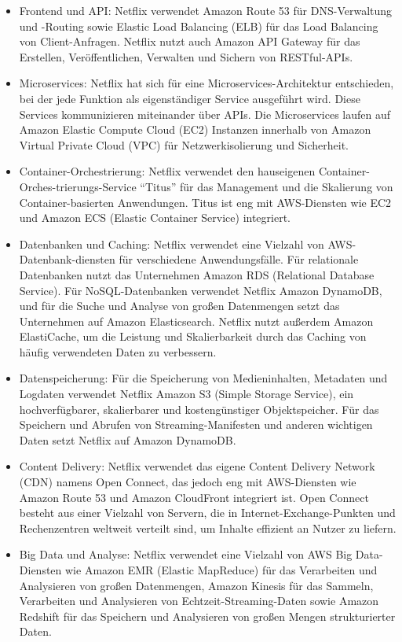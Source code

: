\documentclass[../vs-script-first-v01.tex]{subfiles}
\begin{document}
\begin{itemize}
\item Frontend und API: Netflix verwendet Amazon Route 53 für DNS-Verwaltung und -Routing sowie Elastic Load Balancing (ELB) für das Load Balancing von Client-Anfragen. Netflix nutzt auch Amazon API Gateway für das Erstellen, Veröffentlichen, Verwalten und Sichern von RESTful-APIs.
\item Microservices: Netflix hat sich für eine Microservices-Architektur entschieden, bei der jede Funktion als eigenständiger Service ausgeführt wird. Diese Services kommunizieren miteinander über APIs. Die Microservices laufen auf Amazon Elastic Compute Cloud (EC2) Instanzen innerhalb von Amazon Virtual Private Cloud (VPC) für Netzwerkisolierung und Sicherheit.
\item Container-Orchestrierung: Netflix verwendet den hauseigenen Container-Orches-trierungs-Service \enquote{Titus} für das Management und die Skalierung von Container-basierten Anwendungen. Titus ist eng mit AWS-Diensten wie EC2 und Amazon ECS (Elastic Container Service) integriert.
\item Datenbanken und Caching: Netflix verwendet eine Vielzahl von AWS-Datenbank-diensten für verschiedene Anwendungsfälle. Für relationale Datenbanken nutzt das Unternehmen Amazon RDS (Relational Database Service). Für NoSQL-Datenbanken verwendet Netflix Amazon DynamoDB, und für die Suche und Analyse von großen Datenmengen setzt das Unternehmen auf Amazon Elasticsearch. Netflix nutzt außerdem Amazon ElastiCache, um die Leistung und Skalierbarkeit durch das Caching von häufig verwendeten Daten zu verbessern.
\item Datenspeicherung: Für die Speicherung von Medieninhalten, Metadaten und Logdaten verwendet Netflix Amazon S3 (Simple Storage Service), ein hochverfügbarer, skalierbarer und kostengünstiger Objektspeicher. Für das Speichern und Abrufen von Streaming-Manifesten und anderen wichtigen Daten setzt Netflix auf Amazon DynamoDB.
\item Content Delivery: Netflix verwendet das eigene Content Delivery Network (CDN) namens Open Connect, das jedoch eng mit AWS-Diensten wie Amazon Route 53 und Amazon CloudFront integriert ist. Open Connect besteht aus einer Vielzahl von Servern, die in Internet-Exchange-Punkten und Rechenzentren weltweit verteilt sind, um Inhalte effizient an Nutzer zu liefern.
\item Big Data und Analyse: Netflix verwendet eine Vielzahl von AWS Big Data-Diensten wie Amazon EMR (Elastic MapReduce) für das Verarbeiten und Analysieren von großen Datenmengen, Amazon Kinesis für das Sammeln, Verarbeiten und Analysieren von Echtzeit-Streaming-Daten sowie Amazon Redshift für das Speichern und Analysieren von großen Mengen strukturierter Daten.

\end{itemize}
\end{document}

